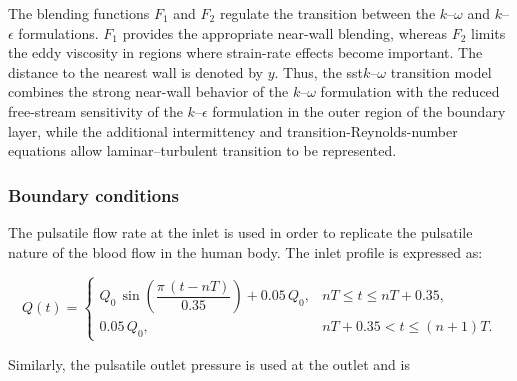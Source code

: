 \documentclass[12pt,a4paper]{article}
\newcommand{\SST}{\ac{sst}\xspace}
\theoremstyle{definition}
\numberwithin{equation}{section}
\providecommand{\DIFaddbegin}{} %
\providecommand{\DIFaddend}{} %
\providecommand{\DIFdelbegin}{} %
\providecommand{\DIFdelend}{} %
\newcommand{\DIFscaledelfig}{0.5}
\newlength{\DIFdelgraphicswidth} %
\newlength{\DIFdelgraphicsheight} %
\newcommand{\DIFaddincludegraphics}[2][]{{\color{blue}\fbox{\DIFOincludegraphics[#1]{#2}}}} %
\newcommand{\DIFdelincludegraphics}[2][]{%
\sbox{\DIFdelgraphicsbox}{\DIFOincludegraphics[#1]{#2}}%
\settoboxwidth{\DIFdelgraphicswidth}{\DIFdelgraphicsbox} %
\settoboxtotalheight{\DIFdelgraphicsheight}{\DIFdelgraphicsbox} %
\scalebox{\DIFscaledelfig}{%
\parbox[b]{\DIFdelgraphicswidth}{\usebox{\DIFdelgraphicsbox}\\[-\baselineskip] \rule{\DIFdelgraphicswidth}{0em}}\llap{\resizebox{\DIFdelgraphicswidth}{\DIFdelgraphicsheight}{%
\setlength{\unitlength}{\DIFdelgraphicswidth}%
\begin{picture}(1,1)%
\thicklines\linethickness{2pt} %
{\color[rgb]{1,0,0}\put(0,0){\framebox(1,1){}}}%
{\color[rgb]{1,0,0}\put(0,0){\line( 1,1){1}}}%
{\color[rgb]{1,0,0}\put(0,1){\line(1,-1){1}}}%
\end{picture}%
}\hspace*{3pt}}} %
} %
\DeclareRobustCommand{\DIFaddbegin}{\DIFOaddbegin \let\includegraphics\DIFaddincludegraphics} %
\DeclareRobustCommand{\DIFaddend}{\DIFOaddend \let\includegraphics\DIFOincludegraphics} %
\DeclareRobustCommand{\DIFdelbegin}{\DIFOdelbegin \let\includegraphics\DIFdelincludegraphics} %
\DeclareRobustCommand{\DIFdelend}{\DIFOaddend \let\includegraphics\DIFOincludegraphics} %
\begin{document}
The blending functions \(F_1\) and \(F_2\) regulate the transition between the \(k\)--\(\omega\) and \(k\)--\(\epsilon\) formulations. \(F_1\) provides the appropriate near-wall blending, whereas \(F_2\) limits the eddy viscosity in regions where strain-rate effects become important. The distance to the nearest wall is denoted by \(y\). Thus, the \SST \(k\)--\(\omega\) transition model combines the strong near-wall behavior of the \(k\)--\(\omega\) formulation with the reduced free-stream sensitivity of the \(k\)--\(\epsilon\) formulation in the outer region of the boundary layer, while the additional intermittency and transition-Reynolds-number equations allow laminar--turbulent transition to be represented.




\subsubsection{Boundary conditions}
The pulsatile flow rate at the inlet is used in order to replicate the pulsatile nature of the blood flow in the human body. The inlet profile is expressed as:

\DIFdelbegin %
\DIFdelend \DIFaddbegin \begin{equation}
Q(t)=
\begin{cases}
Q_0\,\sin\!\left(\dfrac{\pi\,(t-nT)}{0.35}\right)+0.05\,Q_0,
& nT \le t \le nT+0.35, \\[6pt]
0.05\,Q_0,
& nT+0.35 < t \le (n+1)T.
\end{cases}
\label{eq:inlet_waveform}
\end{equation}\DIFaddend 


Similarly, the pulsatile outlet pressure is used at the outlet and is
\end{document}
